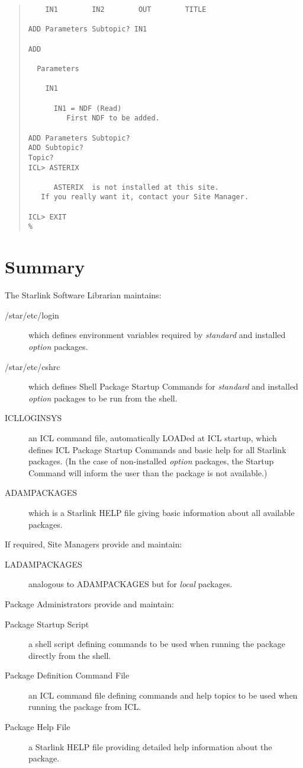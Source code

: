\documentclass[twoside,11pt]{article}
\newcommand{\xlabel}[1]{}
\renewcommand{\_}{\texttt{\symbol{95}}}
\begin{document}
\begin{quote}
\begin{verbatim}
    IN1        IN2        OUT        TITLE 
  
ADD Parameters Subtopic? IN1 
  
ADD 
  
  Parameters 
  
    IN1 
  
      IN1 = NDF (Read) 
         First NDF to be added. 
  
ADD Parameters Subtopic? 
ADD Subtopic? 
Topic? 
ICL> ASTERIX

      ASTERIX  is not installed at this site.
   If you really want it, contact your Site Manager.

ICL> EXIT 
%
\end{verbatim}
\end{quote}
\normalsize

\section{\xlabel{summary}Summary}
The Starlink Software Librarian maintains:
\begin{description}
\item[/star/etc/login] which defines environment variables required by
\textit{standard} and installed \textit{option} packages.
\item[/star/etc/cshrc] which defines Shell Package Startup Commands for 
\textit{standard} and installed \textit{option} packages to be run from the shell.
\item[ICL\_LOGIN\_SYS] an ICL command file, automatically LOADed at ICL startup,
which defines ICL Package Startup Commands and basic help for all Starlink 
packages. (In the case of non-installed \textit{option} packages, the Startup 
Command will inform the user than the package is not available.)
\item[ADAM\_PACKAGES] which is a Starlink HELP file giving basic information
about all available packages.
\end{description}
If required, Site Managers provide and maintain:
\begin{description}
\item[LADAM\_PACKAGES] analogous to ADAM\_PACKAGES but for \textit{local} packages.
\end{description}
Package Administrators provide and maintain:
\begin{description}
\item[Package Startup Script] a shell script defining commands to be used when 
running the package directly from the shell.
\item[Package Definition Command File] an ICL command file defining commands
and help topics to be used when running the package from ICL.
\item[Package Help File] a Starlink HELP file providing detailed help 
information about the package.
\end{description}
\end{document}
